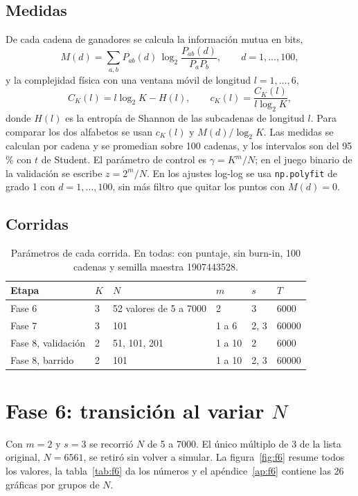 \documentclass[11pt,letterpaper]{article}
\begin{document}
\subsection{Medidas}
De cada cadena de ganadores se calcula la información mutua en bits,
\begin{equation}
M(d)=\sum_{a,b} P_{ab}(d)\,\log_2\frac{P_{ab}(d)}{P_a P_b},\qquad d=1,\dots,100,
\end{equation}
y la complejidad física con una ventana móvil de longitud $l=1,\dots,6$,
\begin{equation}
C_K(l)=l\log_2 K-H(l),\qquad c_K(l)=\frac{C_K(l)}{l\log_2 K},
\end{equation}
donde $H(l)$ es la entropía de Shannon de las subcadenas de longitud $l$. Para comparar los dos alfabetos se usan $c_K(l)$ y $M(d)/\log_2 K$. Las medidas se calculan por cadena y se promedian sobre 100 cadenas, y los intervalos son del 95\,\% con $t$ de Student. El parámetro de control es $\gamma=K^m/N$; en el juego binario de la validación se escribe $z=2^m/N$. En los ajustes log-log se usa \texttt{np.polyfit} de grado 1 con $d=1,\dots,100$, sin más filtro que quitar los puntos con $M(d)=0$.

\subsection{Corridas}
\begin{table}[H]
\centering\small
\caption{Parámetros de cada corrida. En todas: con puntaje, sin burn-in, 100 cadenas y semilla maestra 1907443528.}
\begin{tabular}{llllll}
\toprule
Etapa & $K$ & $N$ & $m$ & $s$ & $T$\\
\midrule
Fase 6 & 3 & 52 valores de 5 a 7000 & 2 & 3 & 6000\\
Fase 7 & 3 & 101 & 1 a 6 & 2, 3 & 60000\\
Fase 8, validación & 2 & 51, 101, 201 & 1 a 10 & 2 & 6000\\
Fase 8, barrido & 2 & 101 & 1 a 10 & 2, 3 & 60000\\
\bottomrule
\end{tabular}
\end{table}

\section{Fase 6: transición al variar $N$}
Con $m=2$ y $s=3$ se recorrió $N$ de 5 a 7000. El único múltiplo de 3 de la lista original, $N=6561$, se retiró sin volver a simular. La figura~\ref{fig:f6} resume todos los valores, la tabla~\ref{tab:f6} da los números y el apéndice~\ref{ap:f6} contiene las 26 gráficas por grupos de $N$.
\end{document}
